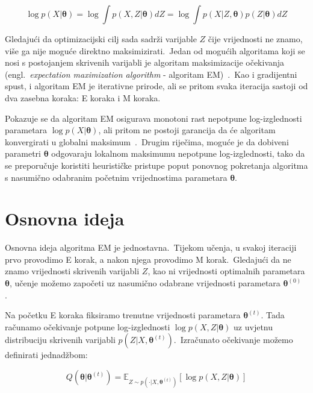 \documentclass[diplomskirad]{fer}
\begin{document}
\begin{equation}
  \log p(X | \bm{\theta}) = \log \int p(X, Z | \bm{\theta}) dZ = \log \int p(X | Z, \bm{\theta}) p(Z |\bm{\theta}) dZ
  \label{eq:log_likelihood_latent}
\end{equation}

Gledajući da optimizacijski cilj sada sadrži varijable $Z$ čije vrijednosti ne znamo, više ga nije moguće direktno maksimizirati.\ 
Jedan od mogućih algoritama koji se nosi s postojanjem skrivenih varijabli je algoritam maksimizacije očekivanja (engl.\ \textit{expectation maximization algorithm} - algoritam EM)~\cite{moon1996expectation}.\ 
Kao i gradijentni spust, i algoritam EM je iterativne prirode, ali se pritom svaka iteracija sastoji od dva zasebna koraka: E koraka i M koraka.\ 
  
Pokazuje se da algoritam EM osigurava monotoni rast nepotpune log-izglednosti parametara $\log p(X | \bm{\theta})$, ali pritom ne postoji garancija da će algoritam konvergirati u globalni maksimum~\cite{wu1983convergence}.\
Drugim riječima, moguće je da dobiveni parametri $\bm{\theta}$ odgovaraju lokalnom maksimumu nepotpune log-izglednosti, tako da se preporučuje koristiti heurističke pristupe poput ponovnog pokretanja algoritma s nasumično odabranim početnim vrijednostima parametara $\bm{\theta}$.\ 

\section{Osnovna ideja}
\label{sek:osnovni_em}

Osnovna ideja algoritma EM je jednostavna.\ Tijekom učenja, u svakoj iteraciji prvo provodimo E korak, a nakon njega provodimo M korak.\ 
Gledajući da ne znamo vrijednosti skrivenih varijabli $Z$, kao ni vrijednosti optimalnih parametara $\bm{\theta}$, učenje možemo započeti uz nasumično odabrane vrijednosti parametara $\bm{\theta}^{(0)}$.\ 
  
Na početku E koraka fiksiramo trenutne vrijednosti parametara $\bm{\theta}^{(t)}$. Tada računamo očekivanje potpune log-izglednosti $\log p(X, Z | \bm{\theta})$ uz uvjetnu distribuciju skrivenih varijabli $p(Z | X, \bm{\theta}^{(t)})$.\ 
Izračunato očekivanje možemo definirati jednadžbom:

\begin{equation}
  Q (\bm{\theta} | \bm{\theta}^{(t)}) = \mathbb{E}_{Z \sim p(\cdot | X, \bm{\theta}^{(t)})} \left[ \log p(X, Z | \bm{\theta}) \right]
  \label{eq:em_e_step_basic}
\end{equation}
\end{document}
